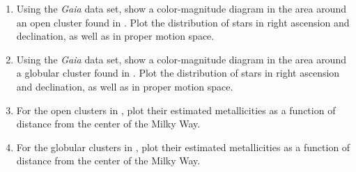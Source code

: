 \begin{enumerate}
\item Using the {\it Gaia} data set, show a color-magnitude
diagram in the area around an open cluster found
in \citet{dias02a}. Plot the distribution of stars in right ascension
and declination, as well as in proper motion space.
\item Using the {\it Gaia} data set, show a color-magnitude
diagram in the area around a globular cluster found
in \citet{harris96a}. Plot the distribution of stars in right
ascension and declination, as well as in proper motion space.
\item For the open clusters in \citet{dias02a}, plot their estimated
metallicities as a function of distance from the center of the Milky
Way.
\item For the globular clusters in \citet{harris96a}, plot their estimated
metallicities as a function of distance from the center of the Milky
Way.
\end{enumerate}


  
